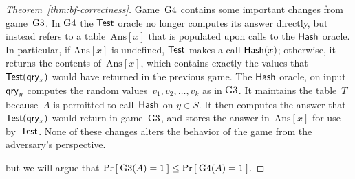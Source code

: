 \begin{proof}[Theorem~\ref{thm:bf-correctness}]
Game~$\text{G4}$ contains some important changes from
game~$\text{G3}$. In $\text{G4}$ the $\mathsf{Test}$ oracle no longer
computes its answer directly, but instead refers to a
table~$\mathrm{Ans}[x]$ that is populated upon calls to the
$\mathsf{Hash}$ oracle.  In particular, if $\mathrm{Ans}[x]$ is
undefined, $\mathsf{Test}$ makes a call $\mathsf{Hash}(x)$; otherwise,
it returns the contents of~$\mathrm{Ans}[x]$, which contains exactly
the values that~$\mathsf{Test}(\mathsf{qry}_x)$ would have returned in the
previous game.  The $\mathsf{Hash}$ oracle, on input~$\mathsf{qry}_y$ computes
the random values~$v_1,v_2,\ldots,v_k$ as in $\text{G3}$. It
maintains the table~$T$ because~$A$ is permitted to
call~$\mathsf{Hash}$ on $y \in S$.
It then computes the answer that~$\mathsf{Test}(\mathsf{qry}_x)$ would return in
game~$\text{G3}$, and stores the answer in~$\mathrm{Ans}[x]$ for use
by~$\mathsf{Test}$.
None of these changes alters the behavior of the game from the
adversary's perspective.

 but we will argue that $\Pr\left[\: \text{G3}(A) = 1 \:\right] \leq
\Pr\left[\: \text{G4}(A)
  = 1 \:\right]$.


\end{proof}
